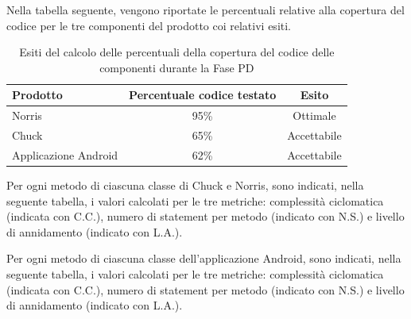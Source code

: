 			Nella tabella seguente, vengono riportate le percentuali relative alla copertura del codice per le tre componenti del prodotto coi relativi esiti.
			\begin{table}[H]
					\centering
						\begin{tabu}{| l | c | c |}
							\hline
							Prodotto	& Percentuale codice testato	& Esito		\\ \hline \hline
							Norris	&	95\% 	& Ottimale  \\ \hline
							Chuck	& 	65\%	& Accettabile  \\ \hline
							Applicazione Android	& 	62\%	& Accettabile  \\ \hline
						\end{tabu}
					\caption{Esiti del calcolo delle percentuali della copertura del codice delle componenti durante la Fase PD}
				\end{table}
			Per ogni metodo di ciascuna classe di Chuck e Norris, sono indicati, nella seguente tabella, i valori calcolati per le tre metriche: complessità ciclomatica (indicata con C.C.), numero di statement per metodo (indicato con N.S.) e livello di annidamento (indicato con L.A.).
				
			Per ogni metodo di ciascuna classe dell'applicazione Android, sono indicati, nella seguente tabella, i valori calcolati per le tre metriche: complessità ciclomatica (indicata con C.C.), numero di statement per metodo (indicato con N.S.) e livello di annidamento (indicato con L.A.).
				
				
